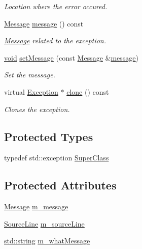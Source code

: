 \begin{DoxyCompactItemize}
\begin{DoxyCompactList}\small\item\em Location where the error occured. \end{DoxyCompactList}\item 
\hyperlink{class_message}{Message} \hyperlink{class_exception_aab5c1504a18016fdfe7574eb81f59ac6}{message} () const 
\begin{DoxyCompactList}\small\item\em \hyperlink{class_message}{Message} related to the exception. \end{DoxyCompactList}\item 
\hyperlink{wglew_8h_aeea6e3dfae3acf232096f57d2d57f084}{void} \hyperlink{class_exception_ad508783fa44767e8fedb6472a4180234}{set\-Message} (const \hyperlink{class_message}{Message} \&\hyperlink{glew_8h_a76333d9470ffdd4811326932394d36da}{message})
\begin{DoxyCompactList}\small\item\em Set the message. \end{DoxyCompactList}\item 
virtual \hyperlink{class_exception}{Exception} $\ast$ \hyperlink{class_exception_ad05463060510ad131ccaaafa6b63b2d7}{clone} () const 
\begin{DoxyCompactList}\small\item\em Clones the exception. \end{DoxyCompactList}\end{DoxyCompactItemize}
\subsection*{Protected Types}
\begin{DoxyCompactItemize}
\item 
typedef std\-::exception \hyperlink{class_exception_a5086086062a7ec2cfe4e609026adfbd9}{Super\-Class}
\end{DoxyCompactItemize}
\subsection*{Protected Attributes}
\begin{DoxyCompactItemize}
\item 
\hyperlink{class_message}{Message} \hyperlink{class_exception_ad77e1fcf64ced674e60e1d9195c634df}{m\-\_\-message}
\item 
\hyperlink{class_source_line}{Source\-Line} \hyperlink{class_exception_ae6685340e219cdcef0d72d45b58c5efb}{m\-\_\-source\-Line}
\item 
\hyperlink{glew_8h_ae84541b4f3d8e1ea24ec0f466a8c568b}{std\-::string} \hyperlink{class_exception_a51b947da686ab2dd290f799b2a05d492}{m\-\_\-what\-Message}
\end{DoxyCompactItemize}


